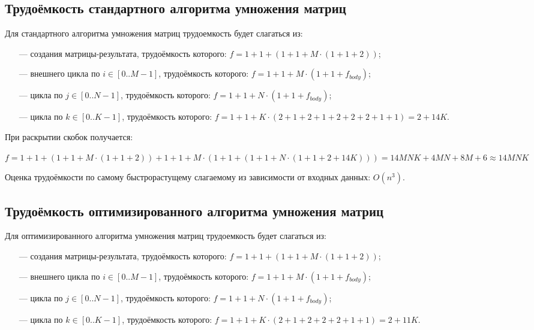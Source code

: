 \subsection{Трудоёмкость стандартного алгоритма умножения матриц}

Для стандартного алгоритма умножения матриц трудоемкость будет слагаться из:

\begin{itemize}
	\item[---] создания матрицы-результата, трудоёмкость которого: $f = 1 + 1 + (1 + 1 + M \cdot (1 + 1 + 2))$;
	\item[---] внешнего цикла по $i \in [0..M-1]$, трудоёмкость которого: $f = 1 + 1 + M \cdot (1 + 1 + f_{body})$;
	\item[---] цикла по $j \in [0..N-1]$, трудоёмкость которого: $f = 1 + 1 + N \cdot (1 + 1 + f_{body})$;
	\item[---] цикла по $k \in [0..K-1]$, трудоёмкость которого: $f = 1 + 1 + K \cdot (2 + 1 + 2 + 1 + 2 + 2 + 2 + 1 + 1) = 2 + 14K$.
\end{itemize}

При раскрытии скобок получается:

$f = 1 + 1 + (1 + 1 + M \cdot (1 + 1 + 2)) + 1 + 1 + M \cdot (1 + 1 + (1 + 1 + N \cdot (1 + 1 + 2 + 14K))) = 14MNK + 4MN + 8M + 6 \approx 14MNK$

Оценка трудоёмкости по самому быстрорастущему слагаемому из зависимости от входных данных: $O(n^3)$.

\subsection{Трудоёмкость оптимизированного алгоритма умножения матриц}

Для оптимизированного алгоритма умножения матриц трудоемкость будет слагаться из:

\begin{itemize}
	\item[---] создания матрицы-результата, трудоёмкость которого: $f = 1 + 1 + (1 + 1 + M \cdot (1 + 1 + 2))$;
	\item[---] внешнего цикла по $i \in [0..M-1]$, трудоёмкость которого: $f = 1 + 1 + M \cdot (1 + 1 + f_{body})$;
	\item[---] цикла по $j \in [0..N-1]$, трудоёмкость которого: $f = 1 + 1 + N \cdot (1 + 1 + f_{body})$;
	\item[---] цикла по $k \in [0..K-1]$, трудоёмкость которого: $f = 1 + 1 + K \cdot (2 + 1 + 2 + 2 + 2 + 1 + 1) = 2 + 11K$.
\end{itemize}

